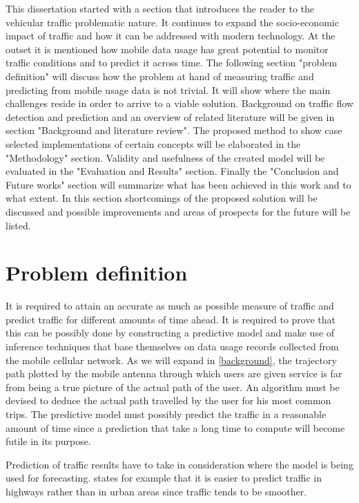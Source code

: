 \documentclass[12pt, a4paper]{report}
\theoremstyle{definition}
\theoremstyle{definition}%
\theoremstyle{definition}%
\theoremstyle{definition}%
\theoremstyle{definition}%
\theoremstyle{definition}%
\begin{document}
This dissertation started with a section that introduces the reader to the vehicular traffic problematic nature. It continues to expand the socio-economic impact of traffic and how it can be addressed with modern technology. At the outset it is mentioned how mobile data usage has great potential to monitor traffic conditions and to predict it across time. The following section "problem definition" will discuss how the problem at hand of measuring traffic and predicting from mobile usage data is not trivial. It will show where the main challenges reside in order to arrive to a viable solution. Background on traffic flow detection and prediction and an overview of related literature will be given in section "Background and literature review". The proposed method to show case selected implementations of certain concepts will be elaborated in the "Methodology" section.  Validity and usefulness of the created model will be evaluated in the "Evaluation and Results" section. Finally the "Conclusion and Future works" section will summarize what has been achieved in this work and to what extent.  In this section shortcomings of the proposed solution will be discussed and possible improvements and areas of prospects for the future will be listed.



\chapter{Problem definition}
It is required to attain an accurate as much as possible measure of traffic and predict traffic for different amounts of time ahead. It is required to prove that this can be possibly done by constructing a predictive model and make use of inference techniques that base themselves on data usage records collected from the mobile cellular network. As we will expand in \ref{background}, the trajectory path plotted by the mobile antenna through which users are given service is far from being a true picture of the actual path of the user.  An algorithm must be devised to deduce the actual path travelled by the user for his most common trips. The predictive model must possibly predict the traffic in a reasonable amount of time since a prediction that take a long time to compute will become futile in its purpose.

Prediction of traffic results have to take in consideration where the model is being used for forecasting. \cite{Sommer2013} states for example that it is easier to predict traffic in highways rather than in urban areas since traffic tends to be smoother.
\end{document}

